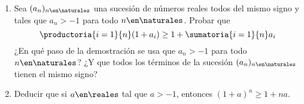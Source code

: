 \begin{enunciado}{\ejercicio}
  \begin{enumerate}[label=\roman*)]
    \item Sea $(a_n)_{n \en \naturales }$ una sucesión de números reales todos del mismo signo y tales que
          $a_n > -1$ para todo $n \en \naturales $. Probar que
          $$
            \productoria{i=1}{n}  (1 + a_i) \geq 1 + \sumatoria{i=1}{n} a_i
          $$
          ¿En qué paso de la demostración se usa que $a_n > -1$ para todo $n \en \naturales $? ¿Y que todos los términos
          de la sucesión $(a_n)_{n \en \naturales }$ tienen el mismo signo?

    \item Deducir que si $a \en \reales $ tal que $a > -1$, entonces $(1+a)^n \geq 1 + na$.
  \end{enumerate}
\end{enunciado}

\setcounter{equation}{0}

